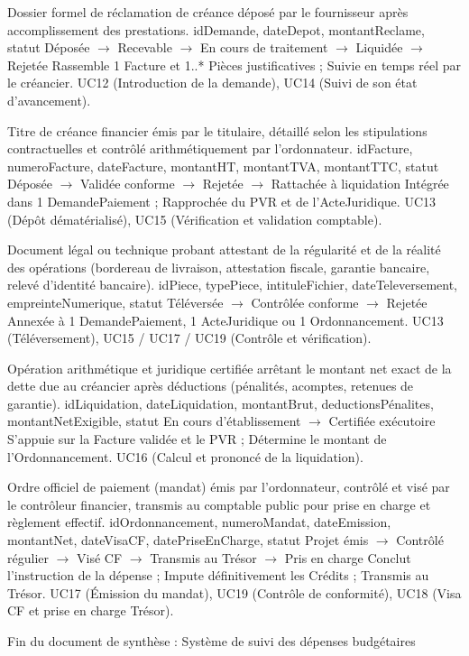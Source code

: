 \documentclass[11pt,a4paper]{article}
\begin{document}
{Dossier formel de réclamation de créance déposé par le fournisseur après accomplissement des prestations.}
{idDemande, dateDepot, montantReclame, statut}
{Déposée $\rightarrow$ Recevable $\rightarrow$ En cours de traitement $\rightarrow$ Liquidée $\rightarrow$ Rejetée}
{Rassemble 1 Facture et 1..* Pièces justificatives ; Suivie en temps réel par le créancier.}
{UC12 (Introduction de la demande), UC14 (Suivi de son état d'avancement).}

{Titre de créance financier émis par le titulaire, détaillé selon les stipulations contractuelles et contrôlé arithmétiquement par l'ordonnateur.}
{idFacture, numeroFacture, dateFacture, montantHT, montantTVA, montantTTC, statut}
{Déposée $\rightarrow$ Validée conforme $\rightarrow$ Rejetée $\rightarrow$ Rattachée à liquidation}
{Intégrée dans 1 DemandePaiement ; Rapprochée du PVR et de l'ActeJuridique.}
{UC13 (Dépôt dématérialisé), UC15 (Vérification et validation comptable).}

{Document légal ou technique probant attestant de la régularité et de la réalité des opérations (bordereau de livraison, attestation fiscale, garantie bancaire, relevé d'identité bancaire).}
{idPiece, typePiece, intituleFichier, dateTeleversement, empreinteNumerique, statut}
{Téléversée $\rightarrow$ Contrôlée conforme $\rightarrow$ Rejetée}
{Annexée à 1 DemandePaiement, 1 ActeJuridique ou 1 Ordonnancement.}
{UC13 (Téléversement), UC15 / UC17 / UC19 (Contrôle et vérification).}

{Opération arithmétique et juridique certifiée arrêtant le montant net exact de la dette due au créancier après déductions (pénalités, acomptes, retenues de garantie).}
{idLiquidation, dateLiquidation, montantBrut, deductionsPénalites, montantNetExigible, statut}
{En cours d'établissement $\rightarrow$ Certifiée exécutoire}
{S'appuie sur la Facture validée et le PVR ; Détermine le montant de l'Ordonnancement.}
{UC16 (Calcul et prononcé de la liquidation).}

{Ordre officiel de paiement (mandat) émis par l'ordonnateur, contrôlé et visé par le contrôleur financier, transmis au comptable public pour prise en charge et règlement effectif.}
{idOrdonnancement, numeroMandat, dateEmission, montantNet, dateVisaCF, datePriseEnCharge, statut}
{Projet émis $\rightarrow$ Contrôlé régulier $\rightarrow$ Visé CF $\rightarrow$ Transmis au Trésor $\rightarrow$ Pris en charge}
{Conclut l'instruction de la dépense ; Impute définitivement les Crédits ; Transmis au Trésor.}
{UC17 (Émission du mandat), UC19 (Contrôle de conformité), UC18 (Visa CF et prise en charge Trésor).}

\vspace{0.4cm}
\begin{center}
  {\footnotesize\sffamily\color{GrisFonce} Fin du document de synthèse : Système de suivi des dépenses budgétaires}
\end{center}
\end{document}
